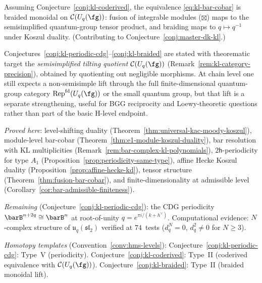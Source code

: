 \begin{conjecture}\label{conj:kl-braided}
Assuming Conjecture~\textup{\ref{conj:kl-coderived}}, the equivalence
\eqref{eq:kl-bar-cobar} is braided monoidal on
$\mathcal{C}(U_q(\fg))$: fusion of integrable
modules ($\boxtimes$) maps to the semisimplified quantum-group tensor
product, and braiding maps to
$q \mapsto q^{-1}$ under Koszul duality.
(Contributing to Conjecture~\ref{conj:master-dk-kl}.)
\end{conjecture}

\begin{remark}\label{rem:kl-conjecture-target}
Conjectures~\ref{conj:kl-periodic-cdg}--\ref{conj:kl-braided} are stated
with theorematic target the \emph{semisimplified tilting quotient}
$\mathcal{C}(U_q(\fg))$ (Remark~\ref{rem:kl-category-precision}),
obtained by quotienting out negligible morphisms.
At chain level one still expects a non-semisimple lift through the
full finite-dimensional quantum-group category
$\mathrm{Rep}^{\mathrm{fd}}(U_q(\fg))$ or the small quantum group,
but that lift is a separate strengthening, useful for BGG reciprocity
and Loewy-theoretic questions rather than part of the basic H-level
endpoint.
\end{remark}

\begin{remark}\label{rem:kl-evidence}
\emph{Proved here}: level-shifting duality (Theorem~\ref{thm:universal-kac-moody-koszul}), module-level bar-cobar (Theorem~\ref{thm:e1-module-koszul-duality}), bar resolution with KL multiplicities (Remark~\ref{rem:bar-complex-kl-polynomials}), $2\mathsf{h}$-periodicity for type $A_1$ (Proposition~\ref{prop:periodicity-same-type}), affine Hecke Koszul duality (Proposition~\ref{prop:affine-hecke-kd}), tensor structure (Theorem~\ref{thm:fusion-bar-cobar}), and finite-dimensionality at admissible level (Corollary~\ref{cor:bar-admissible-finiteness}).

\emph{Remaining} (Conjecture~\ref{conj:kl-periodic-cdg}): the CDG periodicity $\barB^{n+2q} \cong \barB^n$ at root-of-unity $q = e^{\pi i/(k+h^\vee)}$.  Computational evidence: $N$-complex structure of $\mathfrak{u}_q(\mathfrak{sl}_2)$ verified at $74$~tests ($d_q^N = 0$, $d_q^2 \neq 0$ for $N \geq 3$).

\emph{Homotopy templates} (Convention~\ref{conv:hms-levels}): Conjecture~\ref{conj:kl-periodic-cdg}: Type~V (periodicity).  Conjecture~\ref{conj:kl-coderived}: Type~II (coderived equivalence with $\mathcal{C}(U_q(\fg))$).  Conjecture~\ref{conj:kl-braided}: Type~II (braided monoidal lift).
\end{remark}

